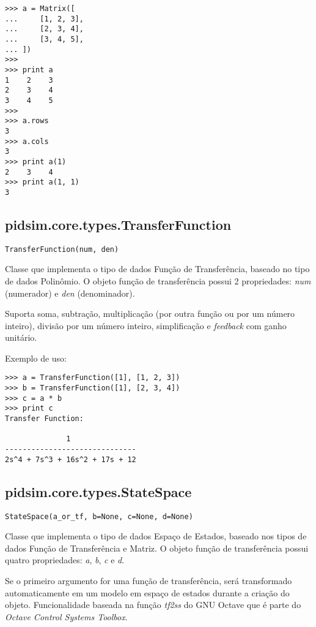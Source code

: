     \begin{verbatim}
>>> a = Matrix([
...     [1, 2, 3],
...     [2, 3, 4],
...     [3, 4, 5],
... ])
>>>
>>> print a
1    2    3
2    3    4
3    4    5
>>>
>>> a.rows
3
>>> a.cols
3
>>> print a(1)
2    3    4
>>> print a(1, 1)
3\end{verbatim}

\subsection{pidsim.core.types.TransferFunction}

    \begin{verbatim}
TransferFunction(num, den)\end{verbatim}

    Classe que implementa o tipo de dados Função de Transferência, baseado
    no tipo de dados Polinômio. O objeto função de transferência possui
    2 propriedades: \textit{num} (numerador) e \textit{den} (denominador).
    
    Suporta soma, subtração, multiplicação (por outra função ou por um
    número inteiro), divisão por um número inteiro, simplificação e
    \textit{feedback} com ganho unitário.
    
    Exemplo de uso:
    
    \begin{verbatim}
>>> a = TransferFunction([1], [1, 2, 3])
>>> b = TransferFunction([1], [2, 3, 4])
>>> c = a * b
>>> print c
Transfer Function:

              1               
------------------------------
2s^4 + 7s^3 + 16s^2 + 17s + 12\end{verbatim}

\subsection{pidsim.core.types.StateSpace}

    \begin{verbatim}
StateSpace(a_or_tf, b=None, c=None, d=None)
    \end{verbatim}

    Classe que implementa o tipo de dados Espaço de Estados, baseado
    nos tipos de dados Função de Transferência e Matriz. O objeto função
    de transferência possui quatro propriedades: \textit{a}, \textit{b},
    \textit{c} e \textit{d}.
    
    Se o primeiro argumento for uma função de transferência, será transformado
    automaticamente em um modelo em espaço de estados durante a criação do
    objeto. Funcionalidade baseada na função \textit{tf2ss} do GNU Octave
    que é parte do \textit{Octave Control Systems Toolbox}.
    
